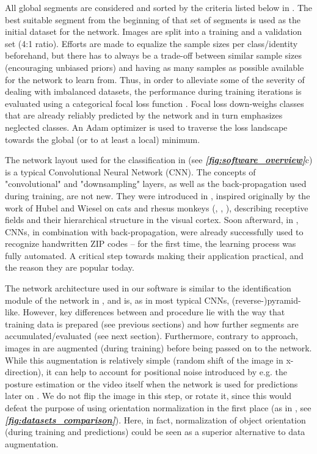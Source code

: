 \documentclass[9pt,lineno]{elife}
\newcommand{\figref}[1]{\textit{\textbf{\ref{#1}}}}
\newcommand{\idtracker}{\protect\path{ idtracker.ai}}
\newcommand{\TRex}{\protect\path{TRex}}
\begin{document}
All global segments are considered and sorted by the criteria listed below in . The best suitable segment from the beginning of that set of segments is used as the initial dataset for the network. Images are split into a training and a validation set (4:1 ratio). Efforts are made to equalize the sample sizes per class/identity beforehand, but there has to always be a trade-off between similar sample sizes (encouraging unbiased priors) and having as many samples as possible available for the network to learn from. Thus, in order to alleviate some of the severity of dealing with imbalanced datasets, the performance during training iterations is evaluated using a categorical focal loss function \citep{lin2017focal}. Focal loss down-weighs classes that are already reliably predicted by the network and in turn emphasizes neglected classes. An Adam optimizer \citep{kingma2014adam} is used to traverse the loss landscape towards the global (or to at least a local) minimum.

The network layout used for the classification in \TRex{} (see \figref{fig:software_overview}c) is a typical Convolutional Neural Network (CNN). The concepts of "convolutional" and "downsampling" layers, as well as the back-propagation used during training, are not new. They were introduced in \cite{fukushima1988neocognitron}, inspired originally by the work of Hubel and Wiesel on cats and rhesus monkeys (\citealt{hubel1959receptive}, \citealt{hubel1963receptive}, \citealt{wiesel1966spatial}), describing receptive fields and their hierarchical structure in the visual cortex. Soon afterward, in \cite{lecun1989backpropagation}, CNNs, in combination with back-propagation, were already successfully used to recognize handwritten ZIP codes -- for the first time, the learning process was fully automated. A critical step towards making their application practical, and the reason they are popular today.

The network architecture used in our software is similar to the identification module of the network in \cite{idtrackerai}, and is, as in most typical CNNs, (reverse-)pyramid-like. However, key differences between \TRex{'} and \idtracker{'s} procedure lie with the way that training data is prepared (see previous sections) and how further segments are accumulated/evaluated (see next section). Furthermore, contrary to \idtracker{'s} approach, images in \TRex{} are augmented (during training) before being passed on to the network. While this augmentation is relatively simple (random shift of the image in x-direction), it can help to account for positional noise introduced by e.g. the posture estimation or the video itself when the network is used for predictions later on \citep{perez2017effectiveness}. We do not flip the image in this step, or rotate it, since this would defeat the purpose of using orientation normalization in the first place (as in , see \figref{fig:datasets_comparison}). Here, in fact, normalization of object orientation (during training and predictions) could be seen as a superior alternative to data augmentation.
\end{document}
